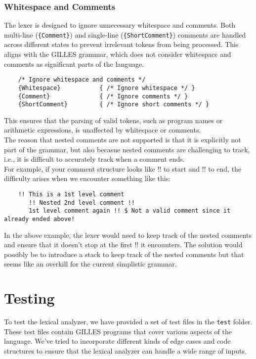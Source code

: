 \documentclass{article}
\begin{document}
	\subsubsection{Whitespace and Comments}
	The lexer is designed to ignore unnecessary whitespace and comments. Both multi-line (\texttt{\{Comment\}}) and single-line (\texttt{\{ShortComment\}}) comments are handled across different states to prevent irrelevant tokens from being processed. This aligns with the GILLES grammar, which does not consider whitespace and comments as significant parts of the language.

	\begin{verbatim}
	/* Ignore whitespace and comments */
	{Whitespace}           { /* Ignore whitespace */ }
	{Comment}              { /* Ignore comments */ }
	{ShortComment}         { /* Ignore short comments */ }
	\end{verbatim}

	This ensures that the parsing of valid tokens, such as program names or arithmetic expressions, is unaffected by whitespace or comments.\\
	The reason that nested comments are not supported is that it is explicitly not part of the grammar, but also becasue nested comments are challenging to track, i.e., it
	is difficult to accurately track when a comment ends.\\

	For example, if your comment structure looks like !! to start and !! to end, the difficulty arises when we encounter something like this:

	\begin{verbatim}
	!! This is a 1st level comment
	   !! Nested 2nd level comment !!
	   1st level comment again !! $ Not a valid comment since it already ended above!
	\end{verbatim}

	In the above example, the lexer would need to keep track of the nested comments and ensure that it doesn't stop at the first !! it encounters. The solution would possibly be to
	introduce a stack to keep track of the nested comments but that seems like an overkill for the current simplistic grammar.\\


	\section{Testing}
	To test the lexical analyzer, we have provided a set of test files in the \texttt{test} folder. These test files contain GILLES programs that cover various aspects of the language.
	We've tried to incorporate different kinds of edge cases and code structures to ensure that the lexical analyzer can handle a wide range of inputs.
\end{document}
